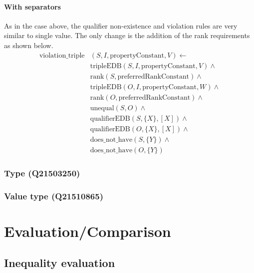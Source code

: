 \documentclass[hyperref,bachelorofscience,fleqn]{cgvpub}
\begin{document}
\subsubsection{With separators}
As in the case above, the qualifier non-existence and violation rules are very similar to single value. The only change is the addition of the rank requirements as shown below.
\begin{equation*}
\begin{split}
\text{violation\_triple}&(S, I, \text{propertyConstant}, V) \leftarrow \\
&\text{tripleEDB}(S, I, \text{propertyConstant}, V) \wedge \\
&\text{rank}(S, \text{preferredRankConstant}) \wedge \\
&\text{tripleEDB}(O, I, \text{propertyConstant}, W) \wedge \\
&\text{rank}(O, \text{preferredRankConstant}) \wedge \\
&\text{unequal}(S, O) \wedge \\
&\text{qualifierEDB}(S, \{X\}, [X]) \wedge \\
&\text{qualifierEDB}(O, \{X\}, [X]) \wedge \\
&\text{does\_not\_have}(S, \{Y\}) \wedge \\
&\text{does\_not\_have}(O, \{Y\})
\end{split}
\end{equation*}

\subsection{Type (Q21503250)}

\subsection{Value type (Q21510865)}

\chapter{Evaluation/Comparison}

\section{Inequality evaluation}\label{sec_inequality_evaluation}
\end{document}
